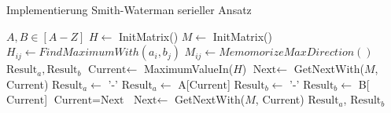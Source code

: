 \begin{algorithm}
  \caption{Implementierung Smith-Waterman serieller Ansatz}
  \label{seriel}
  \begin{algorithmic}[1]
    \Require $A,B \in [A-Z]$
    \State $H\gets$ InitMatrix()
    \State $M\gets$ InitMatrix()
        
          \State $H_{ij} \gets FindMaximumWith(a_i, b_j)$
          \State $M_{ij} \gets MemomorizeMaxDirection()$
        \EndFor
    \EndFor
    \State $\text{Result}_a, \text{Result}_b$
    \State $\text{Current} \gets$ MaximumValueIn($H$)
    \State $\text{Next} \gets$ GetNextWith($M$, Current)
     
       
        \State $\text{Result}_a \gets$ '-'
      \Else {}
        \State $\text{Result}_a \gets$ A[$\text{Current}$]
      \EndIf
       
        \State $\text{Result}_b \gets$ '-'
      \Else {}
        \State $\text{Result}_b \gets$ B[$\text{Current}$]
      \EndIf
      \State $\text{Current} = \text{Next}$
      \State $\text{Next} \gets$ GetNextWith($M$, Current)
    \EndWhile
    \State \Return $\text{Result}_a$, $\text{Result}_b$
  \end{algorithmic}
\end{algorithm}
